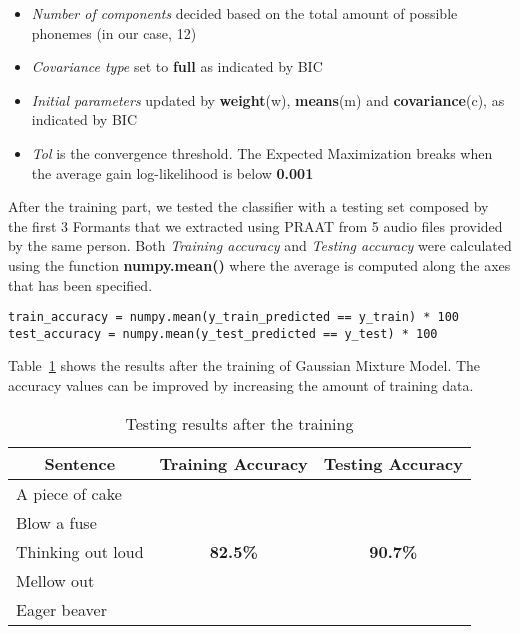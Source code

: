 \begin{itemize}
	\item \textit{Number of components} decided based on the total amount of possible phonemes (in our case, 12)
	\item \textit{Covariance type} set to \textbf{full} as indicated by BIC
	\item \textit{Initial parameters} updated by \textbf{weight}(w), \textbf{means}(m) and \textbf{covariance}(c), as indicated by BIC
	\item \textit{Tol} is the convergence threshold. The Expected Maximization breaks when the average gain log-likelihood is below \textbf{0.001}
\end{itemize}

\noindent After the training part, we tested the classifier with a testing set composed by the first 3 Formants that we extracted using PRAAT from 5 audio files provided by the same person. Both \textit{Training accuracy} and \textit{Testing accuracy} were calculated using the function \textbf{numpy.mean()} where the average is computed along the axes that has been specified.

\begin{lstlisting}[caption={Code for accuracy estimation of training and testing set},label={lst:accuracy}, style=BashInputStyle]
train_accuracy = numpy.mean(y_train_predicted == y_train) * 100
test_accuracy = numpy.mean(y_test_predicted == y_test) * 100
\end{lstlisting}

\noindent Table~\ref{table:accuracy} shows the results after the training of Gaussian Mixture Model. The accuracy values can be improved by increasing the amount of training data.

\begin{table}[!ht]
	\centering
	\caption{Testing results after the training}
	\label{table:accuracy}
	\begin{tabular}{|l|c|c|}
		\hline
		\multicolumn{1}{|c|}{\textbf{Sentence}} & \textbf{Training Accuracy}       & \textbf{Testing Accuracy}        \\ \hline
		A piece of cake                         & 								   &
		\\ \cline{1-1}
		Blow a fuse                             &                                  &                                  \\ \cline{1-1}
		Thinking out loud                       &  \textbf{82.5\%}                 & \textbf{90.7\%}
		\\ \cline{1-1}
		Mellow out                              &                                  &                                  \\ \cline{1-1}
		Eager beaver                            &                                  &                                  \\ \hline
	\end{tabular}
\end{table}

